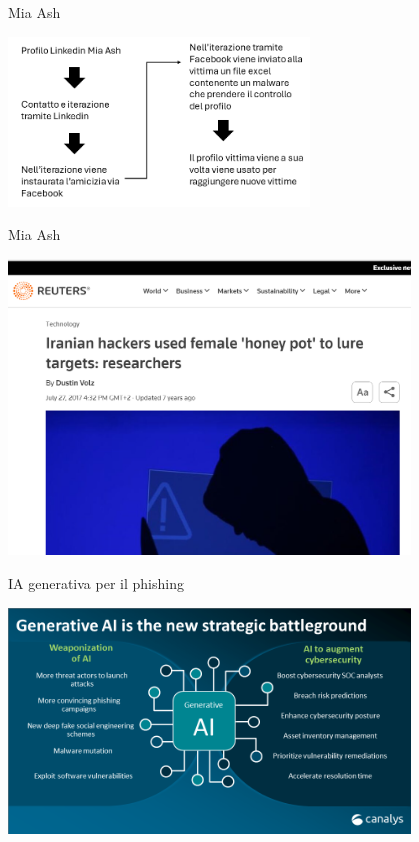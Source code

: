 \documentclass[11pt]{beamer}
\begin{document}
\begin{frame}{Mia Ash \cite{mia_ash_lin}}

\begin{center}
\includegraphics[width=0.6\textwidth]{Pic/MiaAsh_diagram.png}
\end{center}

\end{frame}

\begin{frame}{Mia Ash \cite{mia_ash_reuters}}

\begin{center}
\includegraphics[width=0.8\textwidth]{Pic/reuters_miaash.png}
\end{center}

\end{frame}


\begin{frame}{IA generativa per il phishing \cite{genia_minacce}}

\begin{center}
\includegraphics[width=0.8\textwidth]{Pic/GEN_IA_minacce.png}
\end{center}

\end{frame}
\end{document}

